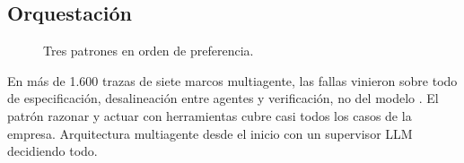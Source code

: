 \subsection{Orquestación}
\label{sec:orquestacion}
\begin{figure}[!htbp]
  \centering
  
  \caption{Tres patrones en orden de preferencia.}
  \label{fig:orquestacion}
\end{figure}

{En más de 1.600 trazas de siete marcos multiagente, las fallas vinieron sobre todo de
especificación, desalineación entre agentes y verificación, no del modelo
\citep{cemri2025mast}. El patrón razonar y actuar con herramientas \citep{yao2023react} cubre
casi todos los casos de la empresa.}
{Arquitectura multiagente desde el inicio con un supervisor LLM decidiendo todo.}
